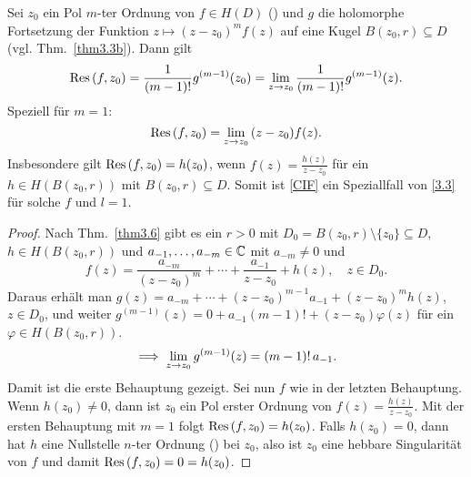 \documentclass[a4paper,twoside,DIV15,BCOR12mm]{scrbook}
\begin{document}
\begin{lem} \label{lem3.11}
  Sei $z_0$ ein Pol $m$-ter Ordnung von $f\in H(D)$ () und $g$ die holomorphe Fortsetzung der Funktion $z\mapsto(z-z_0)^m
  f(z)$ auf eine Kugel $B(z_0,r)\subseteq D$ (vgl. Thm.~\ref{thm3.3b}). Dann gilt
  \[ \mathrm{Res}\left(f,z_0\right) = \frac{1}{(m-1)!} g^{(m-1)}(z_0) = \lim_{z\to z_0}{\frac{1}{(m-1)!}g^{(m-1)}(z)}. \]
  Speziell für $m=1$:
  \[ \mathrm{Res}\left(f,z_0\right) = \lim_{z\to z_0}{(z-z_0)f(z)}. \]
  Insbesondere gilt $\mathrm{Res}\left(f,z_0\right) = h(z_0)$, wenn $f(z)=\frac{h(z)}{z-z_0}$ für ein $h\in H(B(z_0,r))$ mit $B(z_0,r)\subseteq
  D$. Somit ist \eqref{CIF} ein Speziallfall von \eqref{3.3} für solche $f$ und $l=1$.
\end{lem}
\begin{proof}
  Nach Thm.~\ref{thm3.6} gibt es ein $r>0$ mit $D_0=B(z_0,r)\setminus\{z_0\}\subseteq D$, $h\in H(B(z_0,r))$ und
  $a_{-1},\dotsc,a_{-m}\in\mathbb{C}$ mit $a_{-m}\neq0$ und
  \[ f(z) = \frac{a_{-m}}{(z-z_0)^m} + \dotsb + \frac{a_{-1}}{z-z_0} + h(z), \quad z \in D_0. \]
  Daraus erhält man $g(z) = a_{-m}+\dotsb+(z-z_0)^{m-1}a_{-1}+(z-z_0)^m h(z)$, $z\in D_0$, und weiter $g^{(m-1)}(z) = 0 +
  a_{-1}(m-1)! + (z-z_0)\varphi(z)$ für ein $\varphi\in H(B(z_0,r))$.
  \[ \implies \lim_{z\to z_0}{g^{(m-1)}(z)} = (m-1)!\,a_{-1}. \]
  Damit ist die erste Behauptung gezeigt. Sei nun $f$ wie in der letzten Behauptung. Wenn $h(z_0)\neq0$, dann ist $z_0$ ein Pol
  erster Ordnung von $f(z)=\frac{h(z)}{z-z_0}$. Mit der ersten Behauptung mit $m=1$ folgt $\mathrm{Res}\left(f,z_0\right)=h(z_0)$. Falls
  $h(z_0)=0$, dann hat $h$ eine Nullstelle $n$-ter Ordnung () bei $z_0$, also ist $z_0$ eine hebbare Singularität von $f$
  und damit $\mathrm{Res}\left(f,z_0\right)=0=h(z_0)$.
\end{proof}
\end{document}

